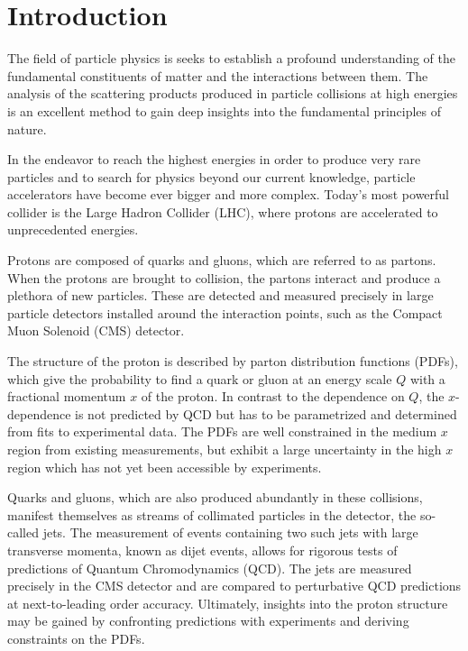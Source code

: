 
\chapter{Introduction}

The field of particle physics is seeks to establish a profound understanding
of the fundamental constituents of matter and the interactions between them.
The analysis of the scattering products produced in particle collisions at high
energies is an excellent method to gain deep insights into the fundamental
principles of nature.

In the endeavor to reach the highest energies in order to produce very rare
particles and to search for physics beyond our current knowledge, particle
accelerators have become ever bigger and more complex. Today's most powerful collider
is the Large Hadron Collider (LHC), where protons are accelerated to unprecedented energies. 

Protons are composed of quarks and gluons, which are referred to as partons.
When the protons are brought to collision, the partons interact and produce a
plethora of new particles. These are detected and measured precisely in large
particle detectors installed around the interaction points, such as the Compact
Muon Solenoid (CMS) detector.

The structure of the proton is described by parton distribution functions
(PDFs), which give the probability to find a quark or gluon at an
energy scale $Q$ with a fractional momentum $x$ of the proton. In contrast to
the dependence on $Q$, the $x$-dependence is not predicted by QCD but has to be parametrized and
determined from fits to experimental data. The PDFs are well constrained in the
medium $x$ region from existing measurements, but exhibit a large uncertainty in
the high $x$ region which has not yet been accessible by experiments.

Quarks and gluons, which are also produced abundantly in these collisions, manifest themselves as
streams of collimated particles in the detector, the so-called
jets. The measurement of events containing two such jets with large transverse
momenta, known as dijet events, allows for rigorous tests of predictions of Quantum
Chromodynamics (QCD). The jets are measured precisely in the CMS detector and
are compared to perturbative QCD predictions at next-to-leading order accuracy.
Ultimately, insights into the proton structure may be gained by confronting
predictions with experiments and deriving constraints on the PDFs.

